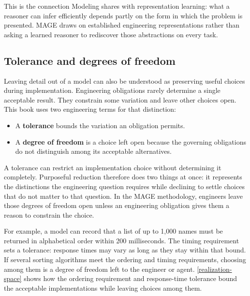 This is the connection Modeling shares with representation learning: what a reasoner can infer efficiently depends partly on the form in which the problem is presented. MAGE draws on established engineering representations rather than asking a learned reasoner to rediscover those abstractions on every task.


\subsection{Tolerance and degrees of freedom}\label{heading:tolerance-and-degrees-of-freedom}

Leaving detail out of a model can also be understood as preserving useful choices during implementation. Engineering obligations rarely determine a single acceptable result. They constrain some variation and leave other choices open. This book uses two engineering terms for that distinction:

\begin{itemize}
\tightlist
\item
  A \textbf{tolerance} bounds the variation an obligation permits.
\item
  A \textbf{degree of freedom} is a choice left open because the governing obligations do not distinguish among its acceptable alternatives.
\end{itemize}

A tolerance can restrict an implementation choice without determining it completely. Purposeful reduction therefore does two things at once: it represents the distinctions the engineering question requires while declining to settle choices that do not matter to that question. In the MAGE methodology, engineers leave those degrees of freedom open unless an engineering obligation gives them a reason to constrain the choice.

For example, a model can record that a list of up to 1,000 names must be returned in alphabetical order within 200 milliseconds. The timing requirement sets a tolerance: response times may vary as long as they stay within that bound. If several sorting algorithms meet the ordering and timing requirements, choosing among them is a degree of freedom left to the engineer or agent. \autoref{realization-space} shows how the ordering requirement and response-time tolerance bound the acceptable implementations while leaving choices among them.

